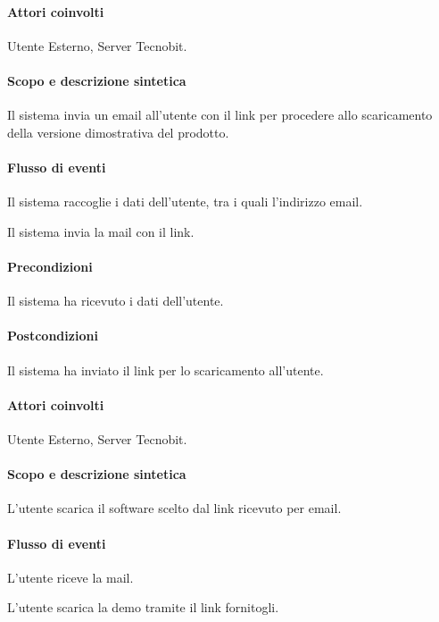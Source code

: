 \paragraph{Attori coinvolti} Utente Esterno, Server Tecnobit.
\paragraph{Scopo e descrizione sintetica}
Il sistema invia un email all'utente con il link per procedere allo scaricamento della versione dimostrativa del prodotto.
\paragraph{Flusso di eventi}
\begin{elenconumerato}[\textbf{}]{\subsubsecindent}
\item Il sistema raccoglie i dati dell'utente, tra i quali l'indirizzo email.
\item Il sistema invia la mail con il link.
\end{elenconumerato}
\paragraph{Precondizioni} Il sistema ha ricevuto i dati dell'utente.
\paragraph{Postcondizioni} Il sistema ha inviato il link per lo scaricamento all'utente.

\paragraph{Attori coinvolti} Utente Esterno, Server Tecnobit.
\paragraph{Scopo e descrizione sintetica}
L'utente scarica il software scelto dal link ricevuto per email.
\paragraph{Flusso di eventi}
\begin{elenconumerato}[\textbf{}]{\subsubsecindent}
\item L'utente riceve la mail.
\item L'utente scarica la demo tramite il link fornitogli.
\end{elenconumerato}
